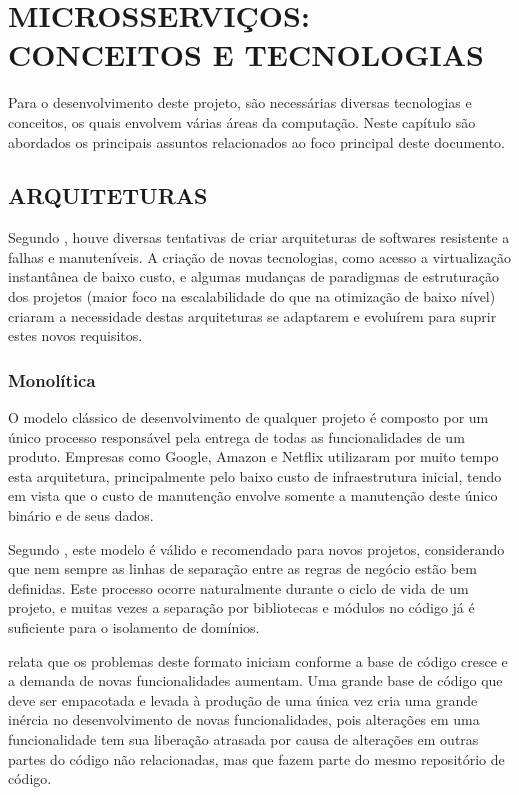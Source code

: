 \chapter{MICROSSERVIÇOS: CONCEITOS E TECNOLOGIAS}
\label{chp:tecnologias}

Para o desenvolvimento deste projeto, são necessárias diversas tecnologias e
conceitos, os quais envolvem várias áreas da computação. Neste capítulo são
abordados os principais assuntos relacionados ao foco principal deste documento.

\section{ARQUITETURAS}

Segundo , houve diversas tentativas de criar
arquiteturas de softwares resistente a falhas e manuteníveis. A criação de
novas tecnologias, como acesso a virtualização instantânea de baixo custo,
e algumas mudanças de paradigmas de estruturação dos projetos (maior foco
na escalabilidade do que na otimização de baixo nível) criaram a
necessidade destas arquiteturas se adaptarem e evoluírem para suprir estes
novos requisitos.

\subsection{Monolítica}

O modelo clássico de desenvolvimento de qualquer projeto é composto por um
único processo responsável pela entrega de todas as funcionalidades de um
produto. Empresas como Google, Amazon e Netflix utilizaram por muito tempo
esta arquitetura, principalmente pelo baixo custo de infraestrutura inicial,
tendo em vista que o custo de manutenção envolve somente a manutenção deste
único binário e de seus dados.

Segundo , este modelo é válido e recomendado para novos
projetos, considerando que nem sempre as linhas de separação entre as regras
de negócio estão bem definidas. Este processo ocorre naturalmente durante o
ciclo de vida de um projeto, e muitas vezes a separação por bibliotecas e
módulos no código já é suficiente para o isolamento de domínios.

 relata que os problemas deste formato iniciam conforme
a base de código cresce e a demanda de novas funcionalidades aumentam. Uma
grande base de código que deve ser empacotada e levada à produção de uma
única vez cria uma grande inércia no desenvolvimento de novas
funcionalidades, pois alterações em uma funcionalidade tem sua liberação
atrasada por causa de alterações em outras partes do código não
relacionadas, mas que fazem parte do mesmo repositório de código.

